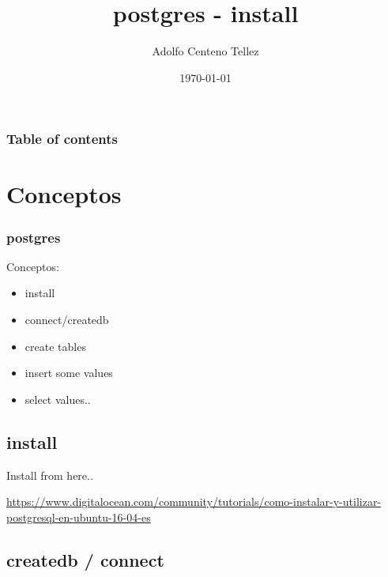 \documentclass{beamer}
\begin{document}
\title{postgres - install}  
\author{Adolfo Centeno Tellez}
\date{\today} 

\begin{frame}
\titlepage
\end{frame}

\begin{frame}\frametitle{Table of contents}\tableofcontents
\end{frame} 




\section{Conceptos} 
\begin{frame}\frametitle{postgres} 

 Conceptos:
 
\begin{itemize}
\item install
\item connect/createdb    
\item create tables
\item insert some values
\item select values..
 

\end{itemize} 



\end{frame}

\subsection{install}

\begin{frame} 
Install from here..

\url{https://www.digitalocean.com/community/tutorials/como-instalar-y-utilizar-postgresql-en-ubuntu-16-04-es}


\end{frame}


\subsection{createdb / connect}

\end{document}
